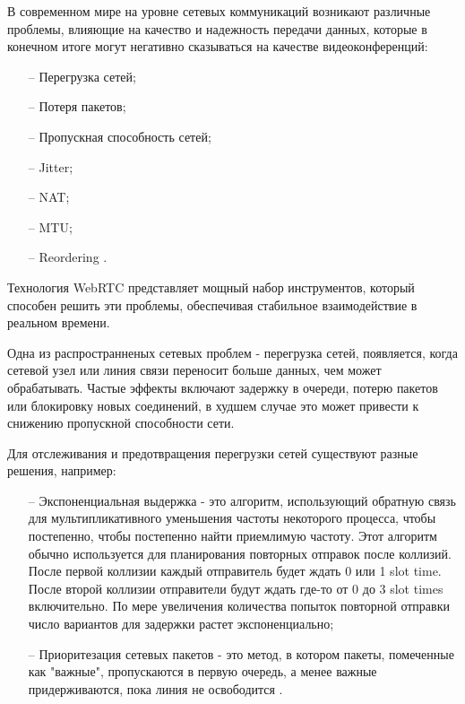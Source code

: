 
В современном мире на уровне сетевых коммуникаций возникают различные проблемы, влияющие на качество и надежность передачи данных, которые в конечном итоге могут негативно сказываться на качестве видеоконференций:
\begin{itemize}
	\item[--] Перегрузка сетей;
	\item[--] Потеря пакетов;
        \item[--] Пропускная способность сетей;
        \item[--] Jitter;
        \item[--] NAT;
        \item[--] MTU;
        \item[--] Reordering \cite{v4}.
\end{itemize}

Технология WebRTC представляет мощный набор инструментов, который способен решить эти проблемы, обеспечивая стабильное взаимодействие в реальном времени.


Одна из распространненых сетевых проблем - перегрузка сетей, появляется, когда сетевой узел или линия связи переносит больше данных, чем может обрабатывать. Частые эффекты включают задержку в очереди, потерю пакетов или блокировку новых соединений, в худшем случае это может привести к снижению пропускной способности сети.

Для отслеживания и предотвращения перегрузки сетей существуют разные решения, например:
\begin{itemize}
	\item[--] Экспоненциальная выдержка - это алгоритм, использующий обратную связь для мультипликативного уменьшения частоты некоторого процесса, чтобы постепенно, чтобы постепенно найти приемлимую частоту. Этот алгоритм обычно используется для планирования повторных отправок после коллизий. После первой коллизии каждый отправитель будет ждать 0 или 1 slot time. После второй коллизии отправители будут ждать где-то от 0 до 3 slot times включительно. По мере увеличения количества попыток повторной отправки число вариантов для задержки растет экспоненциально;
        \item[--] Приоритезация сетевых пакетов - это метод, в котором пакеты, помеченные как "важные", пропускаются в первую очередь, а менее важные придерживаются, пока линия не освободится \cite{v11}.
\end{itemize}

